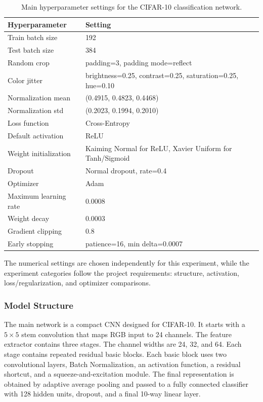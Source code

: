 \documentclass[11pt,a4paper]{article}
\begin{document}
\begin{table}[H]
\centering
\caption{Main hyperparameter settings for the CIFAR-10 classification network.}
\begin{tabular}{ll}
\toprule
Hyperparameter & Setting \\
\midrule
Train batch size & 192 \\
Test batch size & 384 \\
Random crop & padding=3, padding mode=reflect \\
Color jitter & brightness=0.25, contrast=0.25, saturation=0.25, hue=0.10 \\
Normalization mean & (0.4915, 0.4823, 0.4468) \\
Normalization std & (0.2023, 0.1994, 0.2010) \\
Loss function & Cross-Entropy \\
Default activation & ReLU \\
Weight initialization & Kaiming Normal for ReLU, Xavier Uniform for Tanh/Sigmoid \\
Dropout & Normal dropout, rate=0.4 \\
Optimizer & Adam \\
Maximum learning rate & 0.0008 \\
Weight decay & 0.0003 \\
Gradient clipping & 0.8 \\
Early stopping & patience=16, min delta=0.0007 \\
\bottomrule
\end{tabular}
\end{table}

The numerical settings are chosen independently for this experiment, while the
experiment categories follow the project requirements: structure, activation,
loss/regularization, and optimizer comparisons.

\subsubsection{Model Structure}

The main network is a compact CNN designed for CIFAR-10. It starts with a
$5\times5$ stem convolution that maps RGB input to 24 channels. The feature
extractor contains three stages. The channel widths are 24, 32, and 64. Each
stage contains repeated residual basic blocks. Each basic block uses two
convolutional layers, Batch Normalization, an activation function, a residual
shortcut, and a squeeze-and-excitation module. The final representation is
obtained by adaptive average pooling and passed to a fully connected classifier
with 128 hidden units, dropout, and a final 10-way linear layer.
\end{document}
